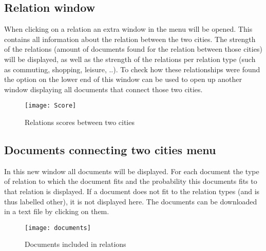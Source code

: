\subsection{Relation window}
When clicking on a relation an extra window in the menu will be opened. This contains all information about the relation between the two cities. The strength of the relations (amount of documents found for the relation between those cities) will be displayed, as well as the strength of the relations per relation type (such as commuting, shopping, leisure, ..). To check how these relationships were found the option on the lower end of this window  can be used to open up another window displaying all documents that connect those two cities.

\begin{figure}[H]
    \centering
    \texttt{[image: Score]}
    \caption{Relations scores between two cities}
    \label{fig:infoflow}
\end{figure}


\subsection{Documents connecting two cities menu}
In this new window all documents will be displayed. For each document the type of relation to which the document fits and the probability this documents fits to that relation is displayed. If a document does not fit to the relation types (and is thus labelled other), it is not displayed here. The documents can be downloaded in a text file by clicking on them.

\begin{figure}[H]
    \centering
    \texttt{[image: documents]}
    \caption{Documents included in relations}
    \label{fig:infoflow}
\end{figure}

